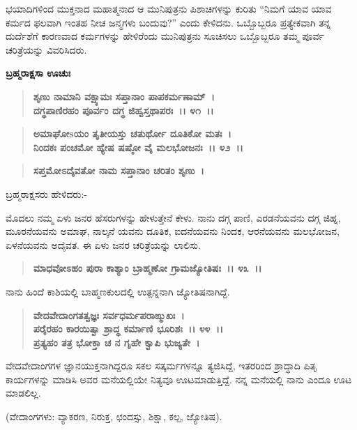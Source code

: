 ಭಯಾದಿಗಳಿಂದ ಮುಕ್ತನಾದ ಮಹಾತ್ಮನಾದ ಆ ಮುನಿಪುತ್ರನು ಪಿಶಾಚಿಗಳನ್ನು ಕುರಿತು “ನಿಮಗೆ ಯಾವ ಯಾವ ಕರ್ಮದ ಫಲವಾಗಿ ಇಂತಹ ನೀಚ ಜನ್ಮಗಳು ಬಂದುವು?” ಎಂದು ಕೇಳಿದನು. ಒಬ್ಬೊಬ್ಬರೂ ಪ್ರತ್ಯೇಕವಾಗಿ ತನ್ನ ದುರ್ದೆಶೆಗೆ ಕಾರಣವಾದ ಕರ್ಮಗಳನ್ನು ಹೇಳಿರೆಂದು ಮುನಿಪುತ್ರನು ಸೂಚಿಸಲು ಒಬ್ಬೊಬ್ಬರೂ ತಮ್ಮ ಪೂರ್ವ ಚರಿತ್ರೆಯನ್ನು ವಿವರಿಸಿದರು.

\begin{flushleft}
\textbf{ಬ್ರಹ್ಮರಾಕ್ಷಸಾ ಊಚುಃ\enginline{-}}
\end{flushleft}

\begin{verse}
\textbf{ಶೃಣು ನಾಮಾನಿ ವಕ್ಷ್ಯಾಮಃ ಸಪ್ತಾನಾಂ ಪಾಪಕರ್ಮಣಾಮ್~।}\\\textbf{ದಗ್ಧಪಾಣಿರಹಂ ಪೂರ್ವಂ ದಗ್ಧ ಜಿಹ್ವಸ್ತಥಾಪರಃ~।। ೪೧~।। }
\end{verse}

\begin{verse}
\textbf{ಅಮಾಘೋsಯಂ ತೃತೀಯಸ್ತು ಚತುರ್ಥೋ ದೂತಿಕೋ ಮತಃ~।}\\\textbf{ನಿಂದಕಃ ಪಂಚಮೋ ಹ್ಯೇಷ ಷಷ್ಠೋ ವೈ ಮಲಭೋಜನಃ~।। ೪೨~।।}
\end{verse}

\begin{verse}
\textbf{ಸಪ್ತಮೋಽದೈವತೋ ನಾಮ ಸಪ್ತಾನಾಂ ಚರಿತಂ ಶೃಣು~।}
\end{verse}

\noindent
 ಬ್ರಹ್ಮರಾಕ್ಷಸರು ಹೇಳಿದರು:-

ಮೊದಲು ನಮ್ಮ ಏಳು ಜನರ ಹೆಸರುಗಳನ್ನು ಹೇಳುತ್ತೇನೆ ಕೇಳು. ನಾನು ದಗ್ಗ ಪಾಣಿ, ಎರಡನೆಯವನು ದಗ್ಗ ಜಿಹ್ನ, ಮೂರನೆಯವನು ಅಮಾಘ, ನಾಲ್ಕನೆ ಯವನು ದೂತಿಕ, ಐದನೆಯವನು ನಿಂದಕ, ಆರನೆಯವನು ಮಲಭೋಜನ, ಏಳನೆಯವನು ಅದೈವತ. ಈ ಏಳು ಜನರ ಚರಿತ್ರೆಯನ್ನು ಲಾಲಿಸು.

\begin{verse}
\textbf{ಮಾಧವೋಽಹಂ ಪುರಾ ಕಾಶ್ಯಾಂ ಬ್ರಾಹ್ಮಣೋ ಗ್ರಾಮಜ್ಯೋತಿಷಃ~।। ೪೩~।।}
\end{verse}

ನಾನು ಹಿಂದೆ ಕಾಶಿಯಲ್ಲಿ ಬಾಹ್ಮಣಕುಲದಲ್ಲಿ ಉತ್ಪನ್ನನಾಗಿ ಜ್ಯೋತಿಷನಾಗಿದ್ದೆ.

\begin{verse}
\textbf{ವೇದವೇದಾಂಗತತ್ವಜ್ಞಃ ಸರ್ವಧರ್ಮಪರಾಙ್ಮುಖಃ~।}\\\textbf{ಪರೈರಹಂ ಕಾರಯಿತ್ವಾ ಶ್ರಾದ್ಧ ಕರ್ಮಾಣಿ ಭೂರಿಶಃ~।। ೪೪~।। }\\\textbf{ಪ್ರತ್ಯಹಂ ತತ್ರ ಭೋಕ್ತಾ ಚ ನ ಗೃಹೇ ಕ್ವಾಪಿ ಭುಜ್ಯತೇ~।}
\end{verse}

ವೇದವೇದಾಂಗಗಳ ಜ್ಞಾನಯುಕ್ತನಾಗಿದ್ದರೂ ಸಕಲ ಸತ್ಕರ್ಮಗಳನ್ನೂ ತ್ಯಜಿಸಿದ್ದೆ, ಇತರರಿಂದ ಶ್ರಾದ್ಧಾದಿ ಪಿತೃ ಕಾರ್ಯಗಳನ್ನು ಮಾಡಿಸಿ ಅವರ ಮನೆಯಲ್ಲಿಯೇ ನಿತ್ಯವೂ ಊಟಮಾಡುತ್ತಿದ್ದೆ. ನನ್ನ ಮನೆಯಲ್ಲಿ ನಾನು ಎಂದೂ ಊಟ ಮಾಡಲಿಲ್ಲ.

(ವೇದಾಂಗಗಳು: ವ್ಯಾಕರಣ, ನಿರುಕ್ತ, ಛಂದಸ್ಸು, ಶಿಕ್ಷಾ, ಕಲ್ಪ, ಜ್ಯೋತಿಷ).

